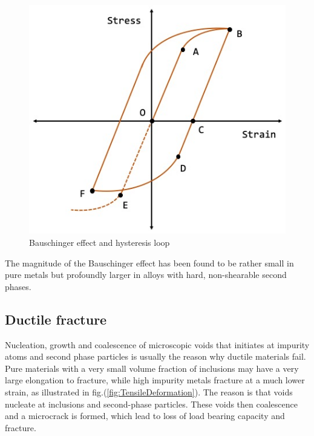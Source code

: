 \documentclass{article}
\begin{document}
\begin{figure}[h!]
    \includegraphics[width=\linewidth]{Bauschinger.jpg}
    \caption{Bauschinger effect and hysteresis loop}
    \label{fig:Bauschinger}
\end{figure}

The magnitude of the Bauschinger effect has been found to be rather small in pure metals but profoundly larger in alloys with hard, non-shearable second phases. 

\subsection{Ductile fracture} \label{Section:DuctileFracture}

Nucleation, growth and coalescence of microscopic voids that initiates at impurity atoms and second phase particles is usually the reason why ductile materials fail. Pure materials with a very small volume fraction of inclusions may have a very large elongation to fracture, while high impurity metals fracture at a much lower strain, as illustrated in fig.(\ref{fig:TensileDeformation}). The reason is that voids nucleate at inclusions and second-phase particles. These voids then coalescence and a microcrack is formed, which lead to loss of load bearing capacity and fracture.
\end{document}
